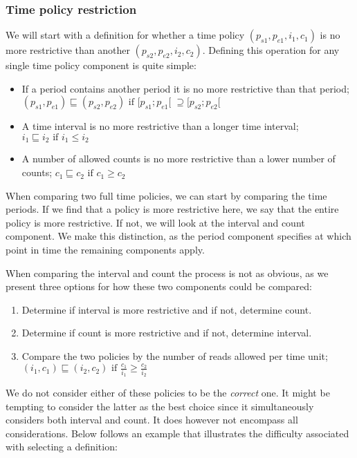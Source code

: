 \subsubsection{Time policy restriction}
We will start with a definition for whether a time policy $(p_{s1}, p_{e1}, i_1, c_1)$ is no more restrictive than another $(p_{s2}, p_{e2}, i_2, c_2)$.
Defining this operation for any single time policy component is quite simple:
\begin{itemize}
  \item If a period contains another period it is no more restrictive than that period; \\
  $(p_{s1}, p_{e1}) \sqsubseteq (p_{s2}, p_{e2}) \text{ if } [p_{s1}; p_{e1}[ \; \supseteq [p_{s2}; p_{e2}[$
  \item A time interval is no more restrictive than a longer time interval; \\
  $i_1 \sqsubseteq i_2 \text{ if } i_1 \leq i_2$
  \item A number of allowed counts is no more restrictive than a lower number of counts;
  $c_1 \sqsubseteq c_2 \text{ if } c_1 \geq c_2$
\end{itemize}

When comparing two full time policies, we can start by comparing the time periods.
If we find that a policy is more restrictive here, we say that the entire policy is more restrictive.
If not, we will look at the interval and count component.
We make this distinction, as the period component specifies at which point in time the remaining components apply.

When comparing the interval and count the process is not as obvious, as we present three options for how these two components could be compared:

\begin{enumerate}
  \item Determine if interval is more restrictive and if not, determine count.
  \item Determine if count is more restrictive and if not, determine interval.
  \item Compare the two policies by the number of reads allowed per time unit; \\
  $(i_1, c_1) \sqsubseteq (i_2, c_2) \text{ if } \displaystyle\frac{c_1}{i_1} \geq \frac{c_2}{i_2}$
\end{enumerate}

We do not consider either of these policies to be the \textit{correct} one.
It might be tempting to consider the latter as the best choice since it simultaneously considers both interval and count.
It does however not encompass all considerations.
Below follows an example that illustrates the difficulty associated with selecting a definition:

